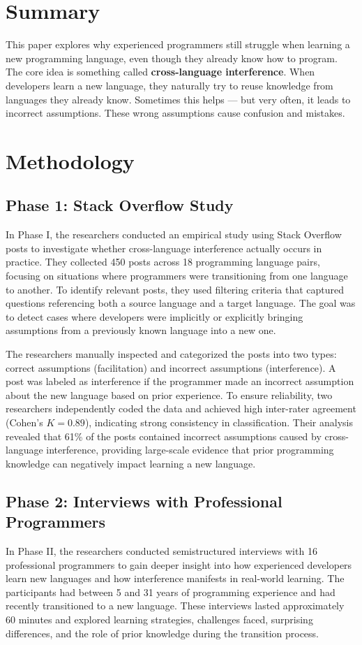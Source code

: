 \section{Summary}
This paper explores why experienced programmers still struggle when learning a new programming language, even though they already know how to program. The core idea is something called \textbf{cross-language interference}. When developers learn a new language, they naturally try to reuse knowledge from languages they already know. Sometimes this helps — but very often, it leads to incorrect assumptions. These wrong assumptions cause confusion and mistakes.

\section{Methodology}
\subsection{Phase 1: Stack Overflow Study}
In Phase I, the researchers conducted an empirical study using Stack Overflow posts to investigate whether cross-language interference actually occurs in practice. They collected 450 posts across 18 programming language pairs, focusing on situations where programmers were transitioning from one language to another. To identify relevant posts, they used filtering criteria that captured questions referencing both a source language and a target language. The goal was to detect cases where developers were implicitly or explicitly bringing assumptions from a previously known language into a new one.

The researchers manually inspected and categorized the posts into two types: correct assumptions (facilitation) and incorrect assumptions (interference). A post was labeled as interference if the programmer made an incorrect assumption about the new language based on prior experience. To ensure reliability, two researchers independently coded the data and achieved high inter-rater agreement (Cohen’s $K = 0.89$), indicating strong consistency in classification. Their analysis revealed that 61\% of the posts contained incorrect assumptions caused by cross-language interference, providing large-scale evidence that prior programming knowledge can negatively impact learning a new language.

\subsection{Phase 2: Interviews with Professional Programmers}
In Phase II, the researchers conducted semistructured interviews with 16 professional programmers to gain deeper insight into how experienced developers learn new languages and how interference manifests in real-world learning. The participants had between 5 and 31 years of programming experience and had recently transitioned to a new language. These interviews lasted approximately 60 minutes and explored learning strategies, challenges faced, surprising differences, and the role of prior knowledge during the transition process.


